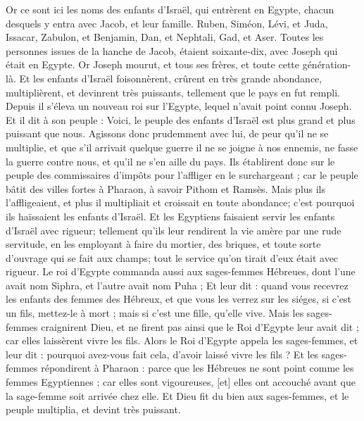 \BFont
\begin{multicols}{2}
\VerseOne{}Or ce sont ici les noms des enfants d'Israël, qui entrèrent en Egypte, chacun desquels y entra avec Jacob, et leur famille.
Ruben, Siméon, Lévi, et Juda,
Issacar, Zabulon, et Benjamin,
Dan, et Nephtali, Gad, et Aser.
Toutes les personnes issues de la hanche de Jacob, étaient soixante-dix, avec Joseph qui était en Egypte.
Or Joseph mourut, et tous ses frères, et toute cette génération-là.
Et les enfants d'Israël foisonnèrent, crûrent en très grande abondance, multiplièrent, et devinrent très puissants, tellement que le pays en fut rempli.
Depuis il s'éleva un nouveau roi sur l'Egypte, lequel n'avait point connu Joseph.
Et il dit à son peuple : Voici, le peuple des enfants d'Israël est plus grand et plus puissant que nous.
Agissons donc prudemment avec lui, de peur qu'il ne se multiplie, et que s'il arrivait quelque guerre il ne se joigne à nos ennemis, ne fasse la guerre contre nous, et qu'il ne s'en aille du pays.
Ils établirent donc sur le peuple des commissaires d'impôts pour l'affliger en le surchargeant ; car le peuple bâtit des villes fortes à Pharaon, à savoir Pithom et Ramsès.
Mais plus ils l'affligeaient, et plus il multipliait et croissait en toute abondance; c'est pourquoi ils haïssaient les enfants d'Israël.
Et les Egyptiens faisaient servir les enfants d'Israël avec rigueur;
tellement qu'ils leur rendirent la vie amère par une rude servitude, en les employant à faire du mortier, des briques, et toute sorte d'ouvrage qui se fait aux champs; tout le service qu'on tirait d'eux était avec rigueur.
Le roi d'Egypte commanda aussi aux sages-femmes Hébreues, dont l'une avait nom Siphra, et l'autre avait nom Puha ;
Et leur dit : quand vous recevrez les enfants des femmes des Hébreux, et que vous les verrez sur les siéges, si c'est un fils, mettez-le à mort ; mais si c'est une fille, qu'elle vive.
Mais les sages-femmes craignirent Dieu, et ne firent pas ainsi que le Roi d'Egypte leur avait dit ; car elles laissèrent vivre les fils.
Alors le Roi d'Egypte appela les sages-femmes, et leur dit : pourquoi avez-vous fait cela, d'avoir laissé vivre les fils ?
Et les sages-femmes répondirent à Pharaon : parce que les Hébreues ne sont point comme les femmes Egyptiennes ; car elles sont vigoureuses, [et] elles ont accouché avant que la sage-femme soit arrivée chez elle.
Et Dieu fit du bien aux sages-femmes, et le peuple multiplia, et devint très puissant.

\end{multicols}
